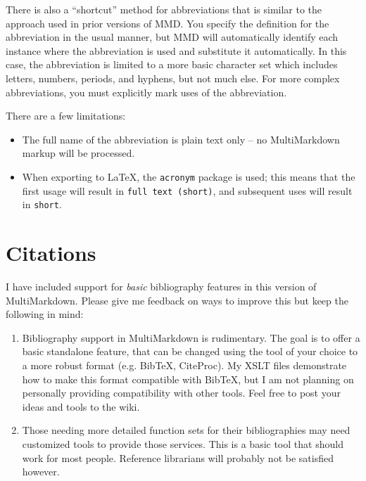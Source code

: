 There is also a ``shortcut'' method for abbreviations that is similar to the approach used in prior versions of \gls{MMD}. You specify the definition for the abbreviation in the usual manner, but \gls{MMD} will automatically identify each instance where the abbreviation is used and substitute it automatically. In this case, the abbreviation is limited to a more basic character set which includes letters, numbers, periods, and hyphens, but not much else. For more complex abbreviations, you must explicitly mark uses of the abbreviation.

There are a few limitations:

\begin{itemize}
\item The full name of the abbreviation is plain text only -- no MultiMarkdown markup will be processed.

\item When exporting to LaTeX, the \texttt{acronym} package is used; this means that the first usage will result in \texttt{full text (short)}, and subsequent uses will result in \texttt{short}.

\end{itemize}

\section{Citations }
\label{citations}

I have included support for \emph{basic} bibliography features in this version of MultiMarkdown. Please give me feedback on ways to improve this but keep the following in mind:

\begin{enumerate}
\item Bibliography support in MultiMarkdown is rudimentary. The goal is to offer a basic standalone feature, that can be changed using the tool of your choice to a more robust format (e.g. BibTeX, CiteProc). My XSLT files demonstrate how to make this format compatible with BibTeX, but I am not planning on personally providing compatibility with other tools. Feel free to post your ideas and tools to the wiki.

\item Those needing more detailed function sets for their bibliographies may need customized tools to provide those services. This is a basic tool that should work for most people. Reference librarians will probably not be satisfied however.

\end{enumerate}

